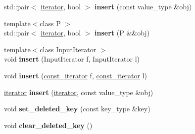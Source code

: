 \begin{DoxyCompactItemize}
\item 
std\+::pair$<$ \hyperlink{classspp___1_1_two__d__iterator}{iterator}, bool $>$ {\bfseries insert} (const value\+\_\+type \&obj)\hypertarget{classspp___1_1sparse__hash__set_a7ff81ceef5ffdac2a4fd48bb08f86500}{}\label{classspp___1_1sparse__hash__set_a7ff81ceef5ffdac2a4fd48bb08f86500}

\item 
{\footnotesize template$<$class P $>$ }\\std\+::pair$<$ \hyperlink{classspp___1_1_two__d__iterator}{iterator}, bool $>$ {\bfseries insert} (P \&\&obj)\hypertarget{classspp___1_1sparse__hash__set_a7bd043d8ad7109de1cb1206799fd9eab}{}\label{classspp___1_1sparse__hash__set_a7bd043d8ad7109de1cb1206799fd9eab}

\item 
{\footnotesize template$<$class Input\+Iterator $>$ }\\void {\bfseries insert} (Input\+Iterator f, Input\+Iterator l)\hypertarget{classspp___1_1sparse__hash__set_a30070f529263549e62856da4c14512ab}{}\label{classspp___1_1sparse__hash__set_a30070f529263549e62856da4c14512ab}

\item 
void {\bfseries insert} (\hyperlink{classspp___1_1_two__d__iterator}{const\+\_\+iterator} f, \hyperlink{classspp___1_1_two__d__iterator}{const\+\_\+iterator} l)\hypertarget{classspp___1_1sparse__hash__set_af548a8d645c002143f56813e4e9ee4e5}{}\label{classspp___1_1sparse__hash__set_af548a8d645c002143f56813e4e9ee4e5}

\item 
\hyperlink{classspp___1_1_two__d__iterator}{iterator} {\bfseries insert} (\hyperlink{classspp___1_1_two__d__iterator}{iterator}, const value\+\_\+type \&obj)\hypertarget{classspp___1_1sparse__hash__set_ae926287e9eb3c99634b9cc88d97f83ca}{}\label{classspp___1_1sparse__hash__set_ae926287e9eb3c99634b9cc88d97f83ca}

\item 
void {\bfseries set\+\_\+deleted\+\_\+key} (const key\+\_\+type \&key)\hypertarget{classspp___1_1sparse__hash__set_acfb712ed7dc09da11299380ccb3f6e7c}{}\label{classspp___1_1sparse__hash__set_acfb712ed7dc09da11299380ccb3f6e7c}

\item 
void {\bfseries clear\+\_\+deleted\+\_\+key} ()\hypertarget{classspp___1_1sparse__hash__set_ac7bbc5379b364907fcd9e5b9be336c2c}{}\label{classspp___1_1sparse__hash__set_ac7bbc5379b364907fcd9e5b9be336c2c}


\end{DoxyCompactItemize}
